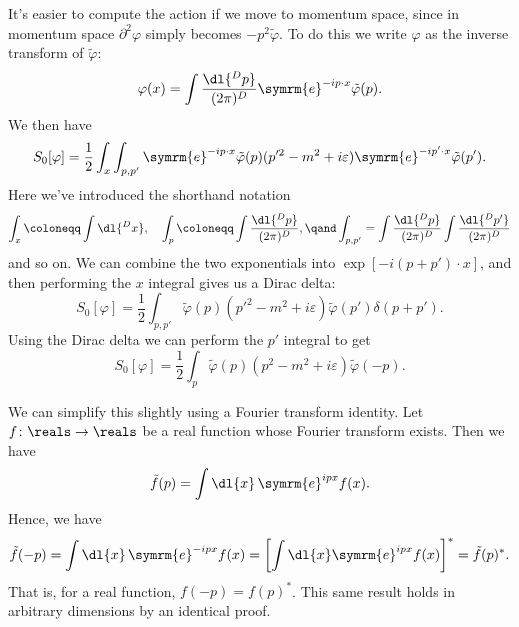 \documentclass[fleqn]{NotesClass}
\newcommand{\dalembertian}{\partial^2}
\newcommand{\e}{\symrm{e}}
\begin{document}
    It's easier to compute the action if we move to momentum space, since in momentum space \(\dalembertian \varphi\) simply becomes \(-p^2\tilde{\varphi}\).
    To do this we write \(\varphi\) as the inverse transform of \(\tilde{\varphi}\):
    \begin{equation}
        \varphi(x) = \int \frac{\dl{^Dp}}{(2\pi)^D} \e^{-ip\cdot x}\tilde{\varphi}(p).
    \end{equation}
    We then have
    \begin{equation}
        S_0[\varphi] = \frac{1}{2} \int_x \int_{p,p'} \e^{-ip\cdot x} \tilde{\varphi}(p) (p'^2 - m^2 + i\varepsilon)\e^{-ip'\cdot x}\tilde{\varphi}(p').
    \end{equation}
    Here we've introduced the shorthand notation
    \begin{equation}
        \int_x \coloneqq \int \dl{^Dx}, \quad \int_{p} \coloneqq \int \frac{\dl{^Dp}}{(2\pi)^D}, \qand \int_{p,p'} = \int \frac{\dl{^Dp}}{(2\pi)^D} \int \frac{\dl{^Dp'}}{(2\pi)^D}
    \end{equation}
    and so on.
    We can combine the two exponentials into \(\exp[-i(p + p') \cdot x]\), and then performing the \(x\) integral gives us a Dirac delta:
    \begin{equation}
        S_0[\varphi] = \frac{1}{2} \int_{p,p'} \tilde{\varphi}(p)(p'^2 - m^2 + i\varepsilon) \tilde{\varphi}(p') \delta(p + p').
    \end{equation}
    Using the Dirac delta we can perform the \(p'\) integral to get
    \begin{equation}
        S_0[\varphi] = \frac{1}{2} \int_p \tilde{\varphi}(p)(p^2 - m^2 + i\varepsilon) \tilde{\varphi}(-p).
    \end{equation}
    
    We can simplify this slightly using a Fourier transform identity.
    Let \(f \colon \reals \to \reals\) be a real function whose Fourier transform exists.
    Then we have
    \begin{equation}
        \tilde{f}(p) = \int \dl{x} \, \e^{ipx} f(x).
    \end{equation}
    Hence, we have
    \begin{equation}
        \tilde{f}(-p) = \int \dl{x} \, \e^{-ipx} f(x) = \left[ \int \dl{x} \e^{ipx}f(x) \right]^* = \tilde{f}(p)^*.
    \end{equation}
    That is, for a real function, \(f(-p) = f(p)^*\).
    This same result holds in arbitrary dimensions by an identical proof.
    
\end{document}
